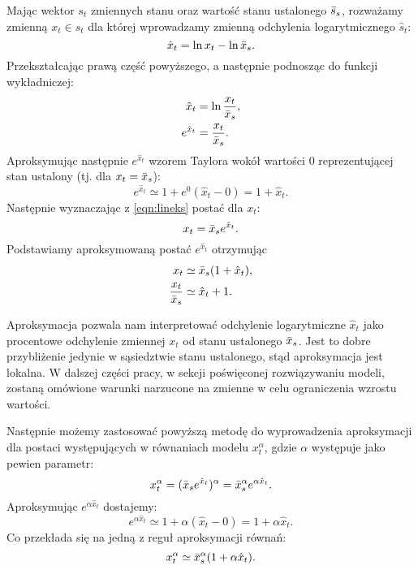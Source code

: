 Mając wektor $s_t$ zmiennych stanu oraz wartość stanu ustalonego $\bar{s}_s$, rozważamy zmienną $x_t \in s_t$ dla której wprowadzamy zmienną odchylenia logarytmicznego $\hat{s}_t$:
\begin{equation}
\label{eqn:linbase}
    \hat{x}_t = \ln x_t - \ln \bar{x}_s.
\end{equation}
Przekształcając prawą część powyższego, a następnie podnosząc do funkcji wykładniczej:
\begin{align}
    \label{eqn:lineks}
    \hat{x}_t &= \ln \frac{x_t}{\bar{x}_s}, \\
    e^{\hat{x}_t} &= \frac{x_t}{\bar{x}_s}.
\end{align}
Aproksymując następnie $e^{\hat{x}_t}$ wzorem Taylora wokół wartości $0$ reprezentującej stan ustalony (tj. dla $x_t = \bar{x}_s$):
\begin{equation}
    e^{\hat{x}_t} \simeq 1 + e^0(\hat{x}_t - 0) = 1 + \hat{x}_t.
\end{equation}
Następnie wyznaczając z \ref{eqn:lineks} postać dla $x_t$:
\begin{equation}
    x_t = \bar{x}_s e^{\hat{x}_t}.
\end{equation}
Podstawiamy aproksymowaną postać $e^{\hat{x}_t}$ otrzymując
\begin{align}
    x_t &\simeq \bar{x}_s(1+\hat{x}_t),\\
    \frac{x_t}{\bar{x}_s} &\simeq \hat{x}_t + 1.
\end{align}

Aproksymacja pozwala nam interpretować odchylenie logarytmiczne $\hat{x}_t$ jako procentowe odchylenie zmiennej $x_t$ od stanu ustalonego $\bar{x}_s$.
Jest to dobre przybliżenie jedynie w sąsiedztwie stanu ustalonego, stąd aproksymacja jest lokalna. W dalszej części pracy, w sekcji poświęconej rozwiązywaniu modeli, zostaną omówione warunki narzucone na zmienne w celu ograniczenia wzrostu wartości.

Następnie możemy zastosować powyższą metodę do wyprowadzenia aproksymacji dla postaci występujących w równaniach modelu $x_t^\alpha$, gdzie $\alpha$ występuje jako pewien parametr:
\begin{equation}
    x_t^\alpha = (\bar{x}_se^{\hat{x}_t})^\alpha = \bar{x}_s^\alpha e^{\alpha\hat{x}_t}.
\end{equation}
Aproksymując $e^{\alpha\hat{x}_t}$ dostajemy:
\begin{equation}
    e^{\alpha\hat{x}_t} \simeq 1 + \alpha(\hat{x}_t - 0) = 1 + \alpha\hat{x}_t.
\end{equation}
Co przekłada się na jedną z reguł aproksymacji równań:
\begin{equation}
    x_t^\alpha \simeq \bar{x}_s^\alpha(1 + \alpha\hat{x}_t).
\end{equation}

